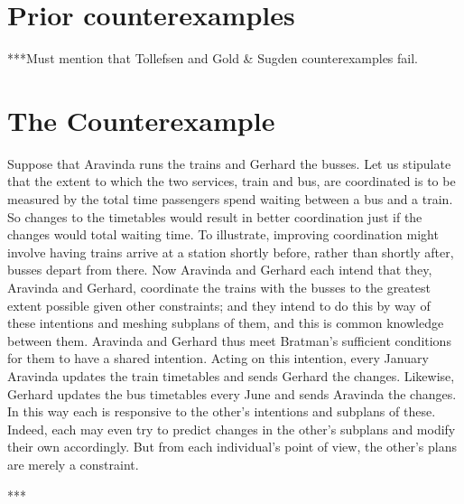 \documentclass[12pt,\papersize]{extarticle}
\begin{document}
\section{Prior counterexamples}
***Must mention that Tollefsen and Gold \& Sugden counterexamples fail.


\section{The Counterexample}
Suppose that Aravinda runs the trains and Gerhard  the busses.
Let us stipulate that the extent to which the two services, train and bus, are coordinated is to be measured by the total time passengers spend waiting between a bus and a train.
So changes to the timetables would result in better coordination just if the changes would total waiting time.
To illustrate, improving coordination might involve having trains arrive at a station shortly before, rather than shortly after, busses depart from there.
Now Aravinda and Gerhard each intend that they, Aravinda and Gerhard, coordinate the trains with the busses to the greatest extent possible given other constraints; and they intend to do this by way of these intentions and meshing subplans of them, and this is common knowledge between them. 
Aravinda and Gerhard thus meet Bratman's sufficient conditions for them to have a shared intention.
Acting on this intention, 
every January Aravinda updates the train timetables and sends Gerhard the changes.
Likewise, Gerhard  updates the bus timetables every June and sends Aravinda the changes.
In this way  each is responsive to the other's intentions and subplans of these. 
Indeed, each may even try to predict changes in the other's subplans and modify their own accordingly.  
But from each individual's point of view, the other's plans are  merely a constraint.

***
\end{document}
